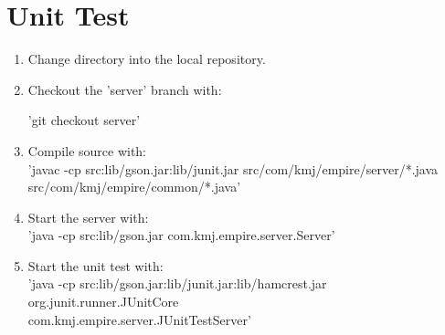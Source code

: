 \section{Unit Test}
\begin{enumerate}
	\item Change directory into the local repository.
	\item Checkout the 'server' branch with:\\
	\begin{center}
	'git checkout server'
	\end{center}
	\item Compile source with:\\
	'javac -cp src:lib/gson.jar:lib/junit.jar src/com/kmj/empire/server/*.java\\
	src/com/kmj/empire/common/*.java'
	\item Start the server with:\\
	'java -cp src:lib/gson.jar com.kmj.empire.server.Server'
	\item Start the unit test with:\\
	'java -cp src:lib/gson.jar:lib/junit.jar:lib/hamcrest.jar org.junit.runner.JUnitCore\\
	com.kmj.empire.server.JUnitTestServer'
\end{enumerate}

